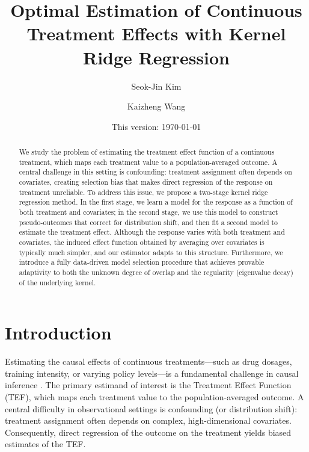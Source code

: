 \documentclass[english,11pt]{article}
\begin{document}
\title{\Large Optimal Estimation of Continuous Treatment Effects with Kernel Ridge Regression}%




\author[1]{Seok-Jin Kim}
\author[2]{Kaizheng Wang}


\date{This version: \today}

\maketitle

\begin{abstract}
We study the problem of estimating the treatment effect function of a continuous treatment, which maps each treatment value to a population-averaged outcome. A central challenge in this setting is confounding: treatment assignment often depends on covariates, creating selection bias that makes direct regression of the response on treatment unreliable. To address this issue, we propose a two-stage kernel ridge regression method. In the first stage, we learn a model for the response as a function of both treatment and covariates; in the second stage, we use this model to construct pseudo-outcomes that correct for distribution shift, and then fit a second model to estimate the treatment effect. Although the response varies with both treatment and covariates, the induced effect function obtained by averaging over covariates is typically much simpler, and our estimator adapts to this structure.
Furthermore, we introduce a fully data-driven model selection procedure that achieves provable adaptivity to both the unknown degree of overlap and the regularity (eigenvalue decay) of the underlying kernel.
\end{abstract}

\section{Introduction}

Estimating the causal effects of continuous treatments—such as drug dosages, training intensity, or varying policy levels—is a fundamental challenge in causal inference \citep{ishak2015simulation,kennedy2017non,colangelo2025double,zhang2025doubly}. The primary estimand of interest is the Treatment Effect Function (TEF), which maps each treatment value to the population-averaged outcome. A central difficulty in observational settings is confounding (or distribution shift): treatment assignment often depends on complex, high-dimensional covariates. Consequently, direct regression of the outcome on the treatment yields biased estimates of the TEF.
\end{document}
